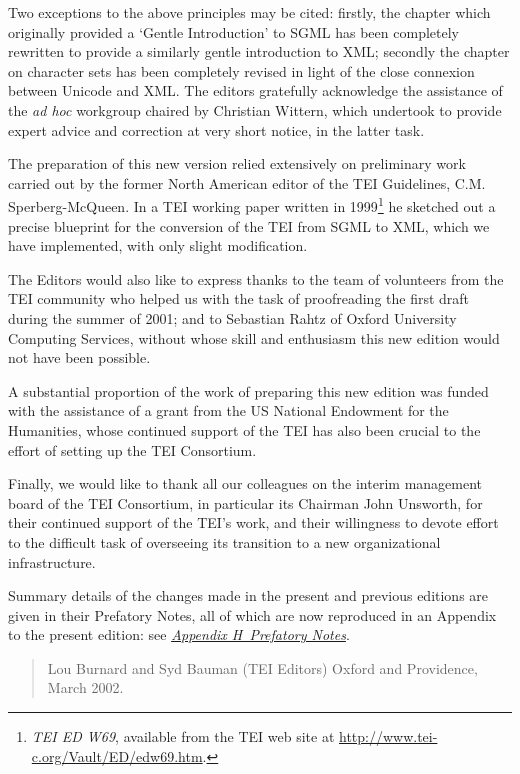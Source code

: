 Two exceptions to the above principles may be cited: firstly, the chapter which originally provided a ‘Gentle Introduction’ to SGML has been completely rewritten to provide a similarly gentle introduction to XML; secondly the chapter on character sets has been completely revised in light of the close connexion between Unicode and XML. The editors gratefully acknowledge the assistance of the \textit{ad hoc} workgroup chaired by Christian Wittern, which undertook to provide expert advice and correction at very short notice, in the latter task.\par
The preparation of this new version relied extensively on preliminary work carried out by the former North American editor of the TEI Guidelines, C.M. Sperberg-McQueen. In a TEI working paper written in 1999\footnote{\textit{TEI ED W69}, available from the TEI web site at \url{http://www.tei-c.org/Vault/ED/edw69.htm}.} he sketched out a precise blueprint for the conversion of the TEI from SGML to XML, which we have implemented, with only slight modification.\par
The Editors would also like to express thanks to the team of volunteers from the TEI community who helped us with the task of proofreading the first draft during the summer of 2001; and to Sebastian Rahtz of Oxford University Computing Services, without whose skill and enthusiasm this new edition would not have been possible. \par
A substantial proportion of the work of preparing this new edition was funded with the assistance of a grant from the US National Endowment for the Humanities, whose continued support of the TEI has also been crucial to the effort of setting up the TEI Consortium. \par
Finally, we would like to thank all our colleagues on the interim management board of the TEI Consortium, in particular its Chairman John Unsworth, for their continued support of the TEI's work, and their willingness to devote effort to the difficult task of overseeing its transition to a new organizational infrastructure.\par
Summary details of the changes made in the present and previous editions are given in their Prefatory Notes, all of which are now reproduced in an Appendix to the present edition: see \textit{\hyperref[PREFS]{Appendix H\ Prefatory Notes}}.

\begin{quote}
Lou Burnard and Syd Bauman (TEI Editors)\mbox{}\newline 
 Oxford and Providence, March 2002.\end{quote}

